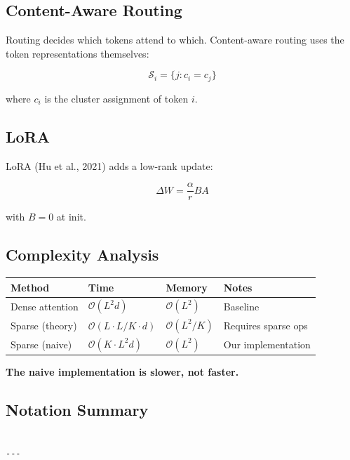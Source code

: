 \subsection{Content-Aware Routing}

Routing decides which tokens attend to which. Content-aware routing uses 
the token representations themselves:

\[
\mathcal{S}_i = \{j : c_i = c_j\}
\tag{3.5}
\]

where $c_i$ is the cluster assignment of token $i$.

\subsection{LoRA}

LoRA (Hu et al., 2021) adds a low-rank update:

\[
\Delta W = \frac{\alpha}{r} B A
\tag{3.6}
\]

with $B = 0$ at init.

\subsection{Complexity Analysis}

\begin{table}[H]
\centering
\small
\begin{tabular}{llll}
\toprule
\textbf{Method} & \textbf{Time} & \textbf{Memory} & \textbf{Notes} \\
\midrule
Dense attention & $\mathcal{O}(L^2 d)$ & $\mathcal{O}(L^2)$ & Baseline \\
Sparse (theory) & $\mathcal{O}(L \cdot L/K \cdot d)$ & $\mathcal{O}(L^2/K)$ & Requires sparse ops \\
Sparse (naive) & $\mathcal{O}(K \cdot L^2 d)$ & $\mathcal{O}(L^2)$ & Our implementation \\
\bottomrule
\end{tabular}
\end{table}

\textbf{The naive implementation is slower, not faster.}

\subsection{Notation Summary}

\begin{lstlisting}

---
\end{lstlisting}